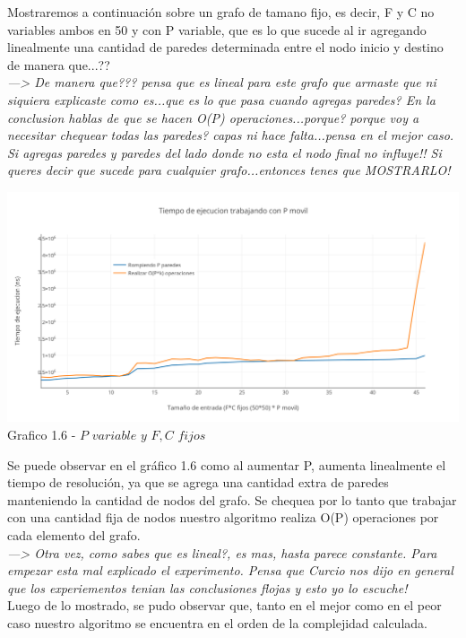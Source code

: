 Mostraremos a continuaci\'on sobre un grafo de tamano fijo, es decir, F y C no variables ambos en 50 y con P variable, que es lo que sucede al ir agregando linealmente una cantidad de paredes determinada entre el nodo inicio y destino de manera que...??\\

\textit{---> De manera que??? pensa que es lineal para este grafo que armaste que ni siquiera explicaste como es...que es lo que pasa cuando agregas paredes? En la conclusion hablas de que se hacen O(P) operaciones...porque? porque voy a necesitar chequear todas las paredes? capas ni hace falta...pensa en el mejor caso. Si agregas paredes y paredes del lado donde no esta el nodo final no influye!! Si queres decir que sucede para cualquier grafo...entonces tenes que MOSTRARLO!}\\

\vspace*{0.3cm} \vspace*{0.3cm}
  \begin{center}
\includegraphics[scale=0.7]{./EJ1/pVariable.png}
{Grafico 1.6 - $P$ $variable$ $y$ $F,C$ $fijos$}
  \end{center}
  \vspace*{0.3cm}

Se puede observar en el gr\'afico 1.6 como al aumentar P, aumenta linealmente el tiempo de resoluci\'on, ya que se agrega una cantidad extra de paredes manteniendo la cantidad de nodos del grafo. Se chequea por lo tanto que trabajar con una cantidad fija de nodos nuestro algoritmo realiza O(P) operaciones por cada elemento del grafo.\\

\textit{---> Otra vez, como sabes que es lineal?, es mas, hasta parece constante. Para empezar esta mal explicado el experimento. Pensa que Curcio nos dijo en general que los experiementos tenian las conclusiones flojas y esto yo lo escuche!}\\

Luego de lo mostrado, se pudo observar que, tanto en el mejor como en el peor caso nuestro algoritmo se encuentra en el orden de la complejidad calculada.